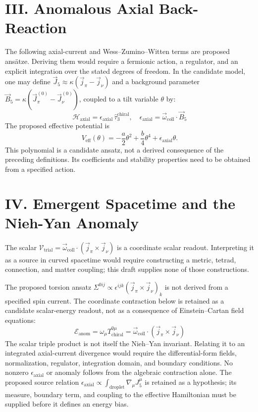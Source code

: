 \documentclass[aps,prl,reprint,superscriptaddress,nofootinbib,amsmath,amssymb]{revtex4-2}
\begin{document}
\section{III. Anomalous Axial Back-Reaction}
The following axial-current and Wess--Zumino--Witten terms are proposed ansätze. Deriving them would require a fermionic action, a regulator, and an explicit integration over the stated degrees of freedom. In the candidate model, one may define $\vec{J}_5 \approx \kappa(\vec{j}_\pi - \vec{j}_\nu)$ and a background parameter $\vec{B}_5 = \kappa ( \vec{J}_\pi^{(0)} - \vec{J}_\nu^{(0)} )$, coupled to a tilt variable $\theta$ by:
\begin{equation}
\mathcal{H}_{\text{axial}} = \epsilon_{\text{axial}} \, \hat{\tau}_3^{\text{chiral}}, \quad \epsilon_{\text{axial}} = \vec{\omega}_{\text{coll}} \cdot \vec{B}_5
\end{equation}
The proposed effective potential is
\begin{equation}
V_{\text{eff}}(\theta) = -\frac{a}{2} \theta^2 + \frac{b}{4} \theta^4 + \epsilon_{\text{axial}} \theta.
\end{equation}
This polynomial is a candidate ansatz, not a derived consequence of the preceding definitions. Its coefficients and stability properties need to be obtained from a specified action.

\section{IV. Emergent Spacetime and the Nieh-Yan Anomaly}
The scalar $\mathcal{V}_{\text{trial}} = \vec{\omega}_{\text{coll}} \cdot (\vec{j}_\pi \times \vec{j}_\nu)$ is a coordinate scalar readout. Interpreting it as a source in curved spacetime would require constructing a metric, tetrad, connection, and matter coupling; this draft supplies none of those constructions.

The proposed torsion ansatz $\Sigma^{0ij} \propto \epsilon^{ijk} (\vec{j}_\pi \times \vec{j}_\nu)_k$ is not derived from a specified spin current. The coordinate contraction below is retained as a candidate scalar-energy readout, not as a consequence of Einstein--Cartan field equations:
\begin{equation}
\mathcal{E}_{\text{anom}} = \omega_\mu T^{0\mu}_{\text{chiral}} = \vec{\omega}_{\text{coll}} \cdot (\vec{j}_\pi \times \vec{j}_\nu)
\end{equation}
The scalar triple product is not itself the Nieh--Yan invariant. Relating it to an integrated axial-current divergence would require the differential-form fields, normalization, regulator, integration domain, and boundary conditions. No nonzero $\epsilon_{\text{axial}}$ or anomaly follows from the algebraic contraction alone.
The proposed source relation $\epsilon_{\text{axial}}\propto\int_{\text{droplet}}\nabla_\mu J_5^\mu$ is retained as a hypothesis; its measure, boundary term, and coupling to the effective Hamiltonian must be supplied before it defines an energy bias.
\end{document}
